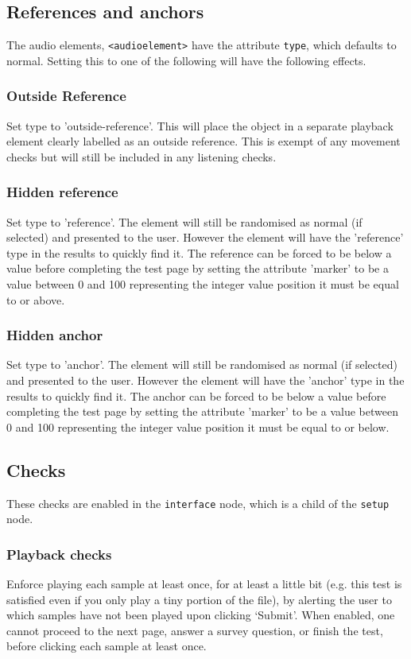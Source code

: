 \documentclass[11pt, oneside]{article}   	%
\begin{document}
	\subsection{References and anchors}
	\label{sec:referencesandanchors}
	    The audio elements, \texttt{<audioelement>} have the attribute \texttt{type}, which defaults to normal. Setting this to one of the following will have the following effects.
		\subsubsection{Outside Reference}
		    Set type to 'outside-reference'. This will place the object in a separate playback element clearly labelled as an outside reference. This is exempt of any movement checks but will still be included in any listening checks.
		\subsubsection{Hidden reference} 
		    Set type to 'reference'. The element will still be randomised as normal (if selected) and presented to the user. However the element will have the 'reference' type in the results to quickly find it. The reference can be forced to be below a value before completing the test page by setting the attribute 'marker' to be a value between 0 and 100 representing the integer value position it must be equal to or above.
		\subsubsection{Hidden anchor}
		    Set type to 'anchor'. The element will still be randomised as normal (if selected) and presented to the user. However the element will have the 'anchor' type in the results to quickly find it. The anchor can be forced to be below a value before completing the test page by setting the attribute 'marker' to be a value between 0 and 100 representing the integer value position it must be equal to or below.

	\subsection{Checks}
		\label{sec:checks}

		These checks are enabled in the \texttt{interface} node, which is a child of the \texttt{setup} node. 
		\subsubsection{Playback checks}
				Enforce playing each sample at least once, for at least a little bit (e.g. this test is satisfied even if you only play a tiny portion of the file), by alerting the user to which samples have not been played upon clicking `Submit'. When enabled, one cannot proceed to the next page, answer a survey question, or finish the test, before clicking each sample at least once. 
\end{document}
